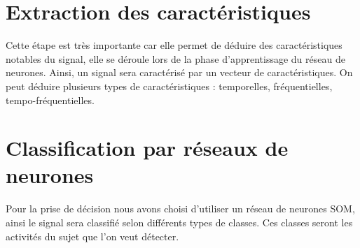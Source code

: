 	\section{Extraction des caractéristiques} %
	\label{sec:extraction_des_caractéristiques}
	Cette étape est très importante car elle permet de déduire des caractéristiques notables du signal, elle se déroule lors de la phase d'apprentissage du réseau de neurones. Ainsi, un signal sera caractérisé par un vecteur de caractéristiques. On peut déduire plusieurs types de caractéristiques : temporelles, fréquentielles, tempo-fréquentielles.

	\section{Classification par réseaux de neurones} %
	\label{sec:classification_par_réseaux_de_neurones}
	Pour la prise de décision nous avons choisi d'utiliser un réseau de neurones SOM, ainsi le signal sera classifié selon différents types de classes. Ces classes seront les activités du sujet que l'on veut détecter. 
